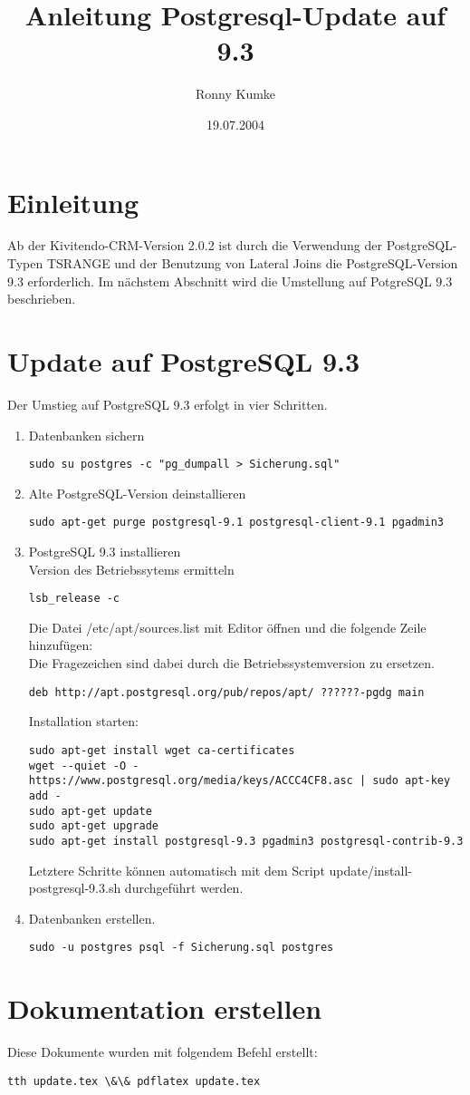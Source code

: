 \documentclass{scrartcl}
\title{Anleitung Postgresql-Update auf 9.3}
\author{Ronny Kumke}
\date{19.07.2004}
\begin{document}
 
\maketitle
\section{Einleitung}
 
Ab der Kivitendo-CRM-Version 2.0.2 ist durch die Verwendung der PostgreSQL-Typen TSRANGE und der Benutzung von Lateral Joins die PostgreSQL-Version 9.3 erforderlich. 
Im nächstem Abschnitt wird die Umstellung auf PotgreSQL 9.3 beschrieben.    
 
\section{Update auf PostgreSQL 9.3}
Der Umstieg auf PostgreSQL 9.3 erfolgt in vier Schritten.\\
\begin{enumerate}
\item Datenbanken sichern\\
\begin{lstlisting}
sudo su postgres -c "pg_dumpall > Sicherung.sql"
\end{lstlisting}
\item Alte PostgreSQL-Version deinstallieren
\begin{lstlisting}
sudo apt-get purge postgresql-9.1 postgresql-client-9.1 pgadmin3 
\end{lstlisting}
\item PostgreSQL 9.3 installieren\\
Version des Betriebssytems ermitteln
\begin{lstlisting}
lsb_release -c
\end{lstlisting}
Die Datei /etc/apt/sources.list mit Editor öffnen und die folgende Zeile hinzufügen:\\
Die Fragezeichen sind dabei durch die Betriebssystemversion zu ersetzen.
\begin{lstlisting}
deb http://apt.postgresql.org/pub/repos/apt/ ??????-pgdg main
\end{lstlisting}
Installation starten:
\begin{lstlisting}
sudo apt-get install wget ca-certificates
wget --quiet -O - https://www.postgresql.org/media/keys/ACCC4CF8.asc | sudo apt-key add -
sudo apt-get update
sudo apt-get upgrade
sudo apt-get install postgresql-9.3 pgadmin3 postgresql-contrib-9.3
\end{lstlisting}
Letztere Schritte können automatisch mit dem Script update/install-postgresql-9.3.sh durchgeführt werden.
\item Datenbanken erstellen.
\begin{lstlisting}
sudo -u postgres psql -f Sicherung.sql postgres 
\end{lstlisting}
\end{enumerate}
\section{Dokumentation erstellen}
Diese Dokumente wurden mit folgendem Befehl erstellt:\\
\begin{lstlisting}
tth update.tex \&\& pdflatex update.tex
\end{lstlisting}
\end{document}
